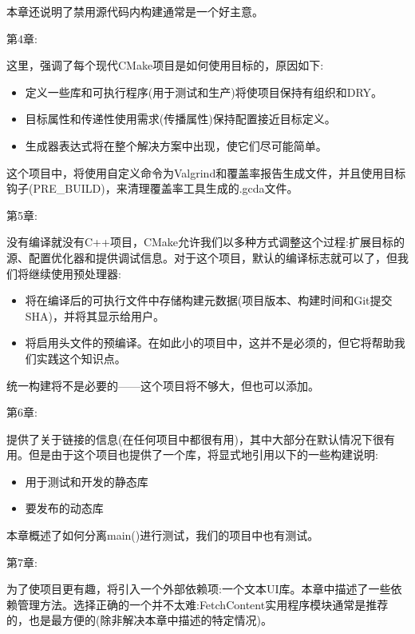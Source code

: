 本章还说明了禁用源代码内构建通常是一个好主意。

第4章:

这里，强调了每个现代CMake项目是如何使用目标的，原因如下:

\begin{itemize}
\item 
定义一些库和可执行程序(用于测试和生产)将使项目保持有组织和DRY。

\item 
目标属性和传递性使用需求(传播属性)保持配置接近目标定义。

\item 
生成器表达式将在整个解决方案中出现，使它们尽可能简单。
\end{itemize}

这个项目中，将使用自定义命令为Valgrind和覆盖率报告生成文件，并且使用目标钩子(PRE\_BUILD)，来清理覆盖率工具生成的.gcda文件。

第5章:

没有编译就没有C++项目，CMake允许我们以多种方式调整这个过程:扩展目标的源、配置优化器和提供调试信息。对于这个项目，默认的编译标志就可以了，但我们将继续使用预处理器:

\begin{itemize}
\item 
将在编译后的可执行文件中存储构建元数据(项目版本、构建时间和Git提交SHA)，并将其显示给用户。
	
\item 
将启用头文件的预编译。在如此小的项目中，这并不是必须的，但它将帮助我们实践这个知识点。
\end{itemize}

统一构建将不是必要的——这个项目将不够大，但也可以添加。

第6章:

提供了关于链接的信息(在任何项目中都很有用)，其中大部分在默认情况下很有用。但是由于这个项目也提供了一个库，将显式地引用以下的一些构建说明:

\begin{itemize}
\item 
用于测试和开发的静态库

\item 
要发布的动态库
\end{itemize}

本章概述了如何分离main()进行测试，我们的项目中也有测试。

第7章:

为了使项目更有趣，将引入一个外部依赖项:一个文本UI库。本章中描述了一些依赖管理方法。选择正确的一个并不太难:FetchContent实用程序模块通常是推荐的，也是最方便的(除非解决本章中描述的特定情况)。

